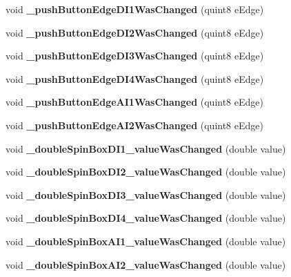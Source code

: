\begin{DoxyCompactItemize}
void {\bfseries \+\_\+push\+Button\+Edge\+D\+I1\+Was\+Changed} (quint8 e\+Edge)
\item 
\mbox{\label{class_setting_trigger_setting_a187b95b267959d56facfac157ca78f49}} 
void {\bfseries \+\_\+push\+Button\+Edge\+D\+I2\+Was\+Changed} (quint8 e\+Edge)
\item 
\mbox{\label{class_setting_trigger_setting_abf700b24d1fc9bf3a09179e4ddd0539a}} 
void {\bfseries \+\_\+push\+Button\+Edge\+D\+I3\+Was\+Changed} (quint8 e\+Edge)
\item 
\mbox{\label{class_setting_trigger_setting_a3718ca29c39ad32bea2ae201e47b78c9}} 
void {\bfseries \+\_\+push\+Button\+Edge\+D\+I4\+Was\+Changed} (quint8 e\+Edge)
\item 
\mbox{\label{class_setting_trigger_setting_ad4f4f1205cbeaa129fc2304d8d42e611}} 
void {\bfseries \+\_\+push\+Button\+Edge\+A\+I1\+Was\+Changed} (quint8 e\+Edge)
\item 
\mbox{\label{class_setting_trigger_setting_a46a406c1a22c4226916533ffeaacab38}} 
void {\bfseries \+\_\+push\+Button\+Edge\+A\+I2\+Was\+Changed} (quint8 e\+Edge)
\item 
\mbox{\label{class_setting_trigger_setting_abd35fe78d8d56ea0864d11df15b6a5f9}} 
void {\bfseries \+\_\+double\+Spin\+Box\+D\+I1\+\_\+value\+Was\+Changed} (double value)
\item 
\mbox{\label{class_setting_trigger_setting_abbbfefa9075d87f178a1b7ecbae4f7ed}} 
void {\bfseries \+\_\+double\+Spin\+Box\+D\+I2\+\_\+value\+Was\+Changed} (double value)
\item 
\mbox{\label{class_setting_trigger_setting_a3023147105a767c2f36f49c6d900db66}} 
void {\bfseries \+\_\+double\+Spin\+Box\+D\+I3\+\_\+value\+Was\+Changed} (double value)
\item 
\mbox{\label{class_setting_trigger_setting_a5146f468fa1bfd99999fde604b082d51}} 
void {\bfseries \+\_\+double\+Spin\+Box\+D\+I4\+\_\+value\+Was\+Changed} (double value)
\item 
\mbox{\label{class_setting_trigger_setting_ac68568e454a74c870da49fefb256972a}} 
void {\bfseries \+\_\+double\+Spin\+Box\+A\+I1\+\_\+value\+Was\+Changed} (double value)
\item 
\mbox{\label{class_setting_trigger_setting_a0d59dc24dc69dadf4d09cf7004bd7e61}} 
void {\bfseries \+\_\+double\+Spin\+Box\+A\+I2\+\_\+value\+Was\+Changed} (double value)
\end{DoxyCompactItemize}
